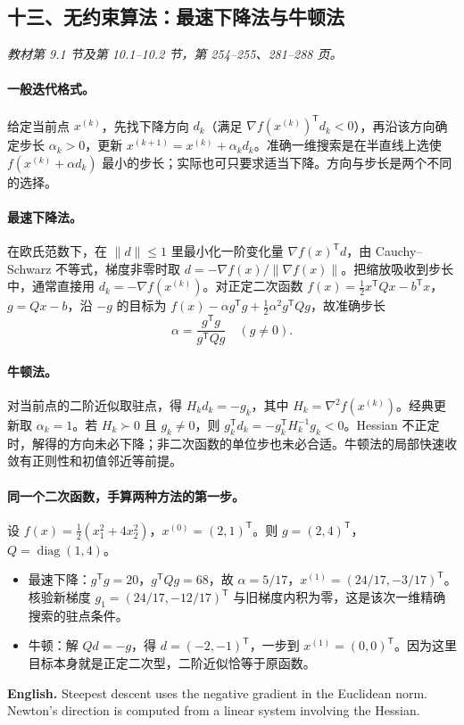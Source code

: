 \documentclass[UTF8,11pt,a4paper]{ctexart}
\newcommand{\EN}[1]{\par\noindent \textbf{English.} #1\par}
\begin{document}
\clearpage
\subsection*{十三、无约束算法：最速下降法与牛顿法}
\noindent\textit{教材第 9.1 节及第 10.1--10.2 节，第 254--255、281--288 页。}
\paragraph{一般迭代格式。}
给定当前点 $x^{(k)}$，先找下降方向 $d_k$（满足 $\nabla f(x^{(k)})^{\mathsf T}d_k<0$），再沿该方向确定步长 $\alpha_k>0$，更新 $x^{(k+1)}=x^{(k)}+\alpha_k d_k$。准确一维搜索是在半直线上选使 $f(x^{(k)}+\alpha d_k)$ 最小的步长；实际也可只要求适当下降。方向与步长是两个不同的选择。

\paragraph{最速下降法。}
在欧氏范数下，在 $\|d\|\le1$ 里最小化一阶变化量 $\nabla f(x)^{\mathsf T}d$，由 Cauchy--Schwarz 不等式，梯度非零时取 $d=-\nabla f(x)/\|\nabla f(x)\|$。把缩放吸收到步长中，通常直接用 $d_k=-\nabla f(x^{(k)})$。对正定二次函数 $f(x)=\tfrac12x^{\mathsf T}Qx-b^{\mathsf T}x$，$g=Qx-b$，沿 $-g$ 的目标为 $f(x)-\alpha g^{\mathsf T}g+\tfrac12\alpha^2 g^{\mathsf T}Qg$，故准确步长
\[
 \alpha=\frac{g^{\mathsf T}g}{g^{\mathsf T}Qg}\quad(g\ne0).
\]
\paragraph{牛顿法。}
对当前点的二阶近似取驻点，得 $H_k d_k=-g_k$，其中 $H_k=\nabla^2f(x^{(k)})$。经典更新取 $\alpha_k=1$。若 $H_k\succ0$ 且 $g_k\ne0$，则 $g_k^{\mathsf T}d_k=-g_k^{\mathsf T}H_k^{-1}g_k<0$。Hessian 不正定时，解得的方向未必下降；非二次函数的单位步也未必合适。牛顿法的局部快速收敛有正则性和初值邻近等前提。

\paragraph{同一个二次函数，手算两种方法的第一步。}
设 $f(x)=\tfrac12(x_1^2+4x_2^2)$，$x^{(0)}=(2,1)^{\mathsf T}$。则 $g=(2,4)^{\mathsf T}$，$Q=\operatorname{diag}(1,4)$。
\begin{itemize}
\item 最速下降：$g^{\mathsf T}g=20$，$g^{\mathsf T}Qg=68$，故 $\alpha=5/17$，$x^{(1)}=(24/17,-3/17)^{\mathsf T}$。核验新梯度 $g_1=(24/17,-12/17)^{\mathsf T}$ 与旧梯度内积为零，这是该次一维精确搜索的驻点条件。
\item 牛顿：解 $Qd=-g$，得 $d=(-2,-1)^{\mathsf T}$，一步到 $x^{(1)}=(0,0)^{\mathsf T}$。因为这里目标本身就是正定二次型，二阶近似恰等于原函数。
\end{itemize}
\EN{Steepest descent uses the negative gradient in the Euclidean norm. Newton's direction is computed from a linear system involving the Hessian.}
\end{document}
